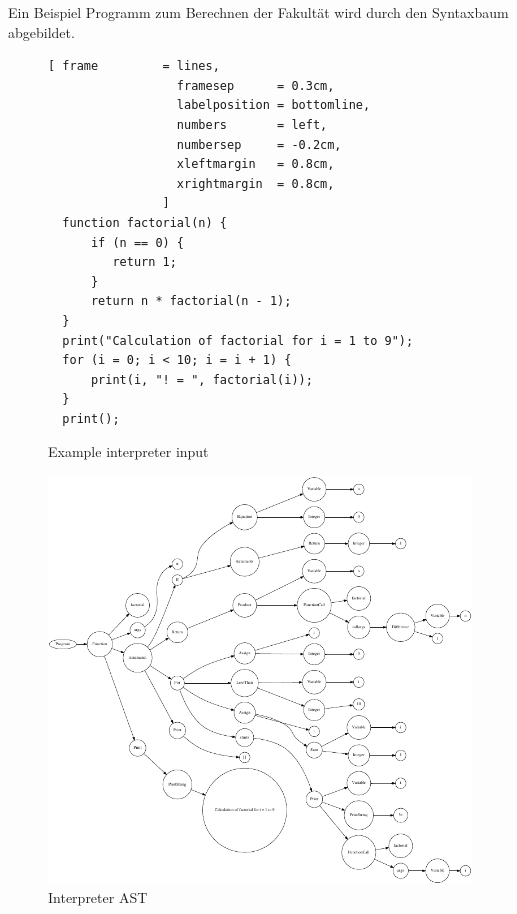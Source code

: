 Ein Beispiel Programm  zum Berechnen der Fakultät wird durch den Syntaxbaum  abgebildet.
\begin{figure}[!ht]

\begin{Verbatim}[ frame         = lines, 
                  framesep      = 0.3cm, 
                  labelposition = bottomline,
                  numbers       = left,
                  numbersep     = -0.2cm,
                  xleftmargin   = 0.8cm,
                  xrightmargin  = 0.8cm,
                ]
  function factorial(n) {
      if (n == 0) {
         return 1;
      }
      return n * factorial(n - 1);
  }
  print("Calculation of factorial for i = 1 to 9");
  for (i = 0; i < 10; i = i + 1) {
      print(i, "! = ", factorial(i));
  }
  print();
		\end{Verbatim}
\caption{Example interpreter input}
\label{fig:example_interpreter_input}
\end{figure}
%
%


\begin{figure}[!ht]
	\centering
		\includegraphics{interpreter_tree.pdf}
	\caption{Interpreter AST}
	\label{fig:interpreter_tree}
\end{figure}

